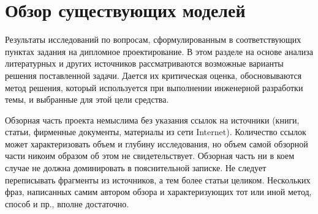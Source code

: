 \section{Обзор существующих моделей}
	Результаты исследований по вопросам, сформулированным в соответствующих пунктах
	задания на дипломное проектирование. В этом разделе на основе анализа литературных и других
	источников рассматриваются возможные варианты решения поставленной задачи. Дается их
	критическая оценка, обосновываются метод решения, который используется при выполнении
	инженерной разработки темы, и выбранные для этой цели средства.
	
	
	Обзорная часть проекта немыслима без указания ссылок на источники (книги, статьи, фирменные
	документы, материалы из сети Internet). Количество ссылок может характеризовать объем и глубину
	исследования, но объем самой обзорной части никоим образом об этом не свидетельствует. Обзорная
	часть ни в коем случае не должна доминировать в пояснительной записке. Не следует переписывать
	фрагменты из источников, а тем более статьи целиком. Нескольких фраз, написанных самим автором
	обзора и характеризующих тот или иной метод, способ и пр., вполне достаточно.